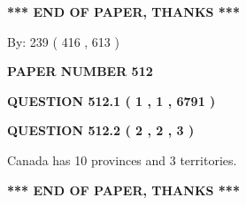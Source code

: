 \documentclass[12pt]{article}
\begin{document}
 
 
 
   
   
 \vspace{0.2in}
 
   
   
   
   
\vspace{1.0in} 
{\textbf{\large{ *** END OF PAPER, THANKS *** }}} 
   
   
\hspace{1.0in} By: 
 239 ( 416 ,  613 )
   
   
   
   
\newpage 
\setcounter{page}{ 
   512001 } 
   
   
   
   
 {\textbf{ \Large{ PAPER NUMBER  512  }}}
   
   
\vspace{0.2in}
   
   
   
   
   
   
 \vspace{0.2in}
 
 
 
 
   
   
  
\vspace{0.2in}
  
{\textbf{\Large{QUESTION
512.1 
 ( 1 , 1 , 6791 )
}}}
  
  
  
\vspace{0.2in}
  
{\textbf{\Large{QUESTION
512.2 
 ( 2 , 2 , 3 )
}}}
  
  
 
 
\noindent{}
 
 
Canada has 10  provinces and 3 territories.
 
 
 
 
   
   
 \vspace{0.2in}
 
   
   
   
   
\vspace{1.0in} 
{\textbf{\large{ *** END OF PAPER, THANKS *** }}} 
   
\end{document}

